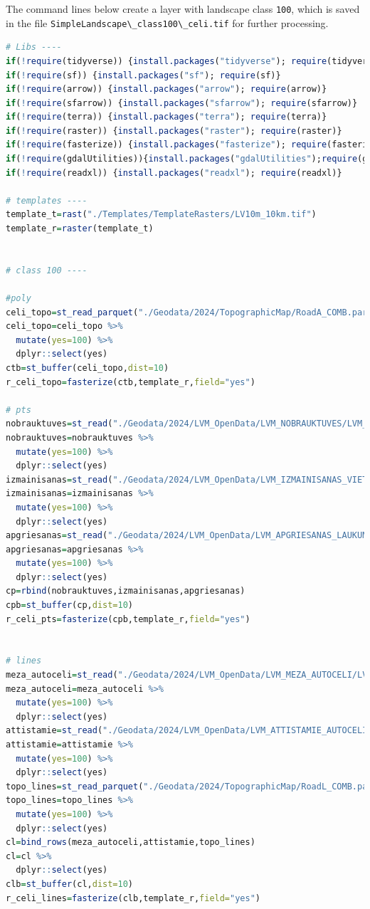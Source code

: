 \documentclass[
]{book}
\newcommand{\passthrough}[1]{#1}
\begin{document}
The command lines below create a layer with landscape class \passthrough{\lstinline!100!}, which is
saved in the file \passthrough{\lstinline!SimpleLandscape\_class100\_celi.tif!} for further processing.

\begin{lstlisting}[language=R]
# Libs ----
if(!require(tidyverse)) {install.packages("tidyverse"); require(tidyverse)}
if(!require(sf)) {install.packages("sf"); require(sf)}
if(!require(arrow)) {install.packages("arrow"); require(arrow)}
if(!require(sfarrow)) {install.packages("sfarrow"); require(sfarrow)}
if(!require(terra)) {install.packages("terra"); require(terra)}
if(!require(raster)) {install.packages("raster"); require(raster)}
if(!require(fasterize)) {install.packages("fasterize"); require(fasterize)}
if(!require(gdalUtilities)){install.packages("gdalUtilities");require(gdalUtilities)}
if(!require(readxl)) {install.packages("readxl"); require(readxl)}

# templates ----
template_t=rast("./Templates/TemplateRasters/LV10m_10km.tif")
template_r=raster(template_t)


# class 100 ----

#poly
celi_topo=st_read_parquet("./Geodata/2024/TopographicMap/RoadA_COMB.parquet")
celi_topo=celi_topo %>% 
  mutate(yes=100) %>% 
  dplyr::select(yes)
ctb=st_buffer(celi_topo,dist=10)
r_celi_topo=fasterize(ctb,template_r,field="yes")

# pts
nobrauktuves=st_read("./Geodata/2024/LVM_OpenData/LVM_NOBRAUKTUVES/LVM_NOBRAUKTUVES_Shape.shp")
nobrauktuves=nobrauktuves %>% 
  mutate(yes=100) %>% 
  dplyr::select(yes)
izmainisanas=st_read("./Geodata/2024/LVM_OpenData/LVM_IZMAINISANAS_VIETAS/LVM_IZMAINISANAS_VIETAS_Shape.shp")
izmainisanas=izmainisanas %>% 
  mutate(yes=100) %>% 
  dplyr::select(yes)
apgriesanas=st_read("./Geodata/2024/LVM_OpenData/LVM_APGRIESANAS_LAUKUMI/LVM_APGRIESANAS_LAUKUMI_Shape.shp")
apgriesanas=apgriesanas %>% 
  mutate(yes=100) %>% 
  dplyr::select(yes)
cp=rbind(nobrauktuves,izmainisanas,apgriesanas)
cpb=st_buffer(cp,dist=10)
r_celi_pts=fasterize(cpb,template_r,field="yes")


# lines
meza_autoceli=st_read("./Geodata/2024/LVM_OpenData/LVM_MEZA_AUTOCELI/LVM_MEZA_AUTOCELI_Shape.shp")
meza_autoceli=meza_autoceli %>% 
  mutate(yes=100) %>% 
  dplyr::select(yes)
attistamie=st_read("./Geodata/2024/LVM_OpenData/LVM_ATTISTAMIE_AUTOCELI/LVM_ATTISTAMIE_AUTOCELI_Shape.shp")
attistamie=attistamie %>% 
  mutate(yes=100) %>% 
  dplyr::select(yes)
topo_lines=st_read_parquet("./Geodata/2024/TopographicMap/RoadL_COMB.parquet")
topo_lines=topo_lines %>% 
  mutate(yes=100) %>% 
  dplyr::select(yes)
cl=bind_rows(meza_autoceli,attistamie,topo_lines)
cl=cl %>% 
  dplyr::select(yes)
clb=st_buffer(cl,dist=10)
r_celi_lines=fasterize(clb,template_r,field="yes")


\end{lstlisting}
\end{document}
